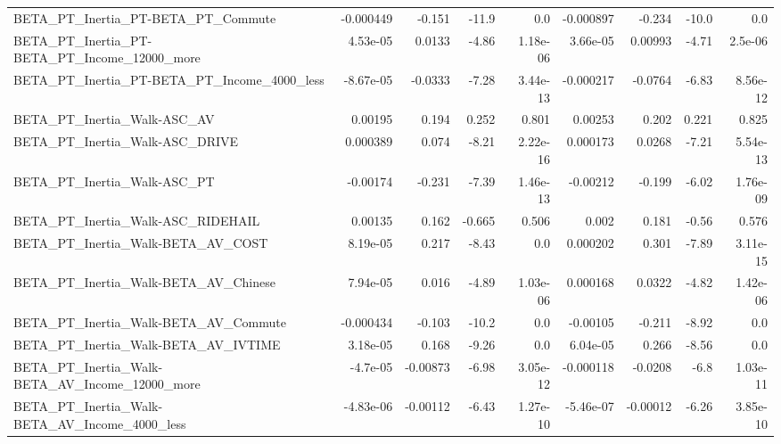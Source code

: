 \begin{tabular}{lrrrrrrrr}
BETA\_PT\_Inertia\_PT-BETA\_PT\_Commute                 &   -0.000449 &       -0.151 &    -11.9 &      0.0 &  -0.000897 &      -0.234 &        -10.0 &           0.0 \\
BETA\_PT\_Inertia\_PT-BETA\_PT\_Income\_12000\_more       &    4.53e-05 &       0.0133 &    -4.86 & 1.18e-06 &   3.66e-05 &     0.00993 &        -4.71 &       2.5e-06 \\
BETA\_PT\_Inertia\_PT-BETA\_PT\_Income\_4000\_less        &   -8.67e-05 &      -0.0333 &    -7.28 & 3.44e-13 &  -0.000217 &     -0.0764 &        -6.83 &      8.56e-12 \\
BETA\_PT\_Inertia\_Walk-ASC\_AV                        &     0.00195 &        0.194 &    0.252 &    0.801 &    0.00253 &       0.202 &        0.221 &         0.825 \\
BETA\_PT\_Inertia\_Walk-ASC\_DRIVE                     &    0.000389 &        0.074 &    -8.21 & 2.22e-16 &   0.000173 &      0.0268 &        -7.21 &      5.54e-13 \\
BETA\_PT\_Inertia\_Walk-ASC\_PT                        &    -0.00174 &       -0.231 &    -7.39 & 1.46e-13 &   -0.00212 &      -0.199 &        -6.02 &      1.76e-09 \\
BETA\_PT\_Inertia\_Walk-ASC\_RIDEHAIL                  &     0.00135 &        0.162 &   -0.665 &    0.506 &      0.002 &       0.181 &        -0.56 &         0.576 \\
BETA\_PT\_Inertia\_Walk-BETA\_AV\_COST                  &    8.19e-05 &        0.217 &    -8.43 &      0.0 &   0.000202 &       0.301 &        -7.89 &      3.11e-15 \\
BETA\_PT\_Inertia\_Walk-BETA\_AV\_Chinese               &    7.94e-05 &        0.016 &    -4.89 & 1.03e-06 &   0.000168 &      0.0322 &        -4.82 &      1.42e-06 \\
BETA\_PT\_Inertia\_Walk-BETA\_AV\_Commute               &   -0.000434 &       -0.103 &    -10.2 &      0.0 &   -0.00105 &      -0.211 &        -8.92 &           0.0 \\
BETA\_PT\_Inertia\_Walk-BETA\_AV\_IVTIME                &    3.18e-05 &        0.168 &    -9.26 &      0.0 &   6.04e-05 &       0.266 &        -8.56 &           0.0 \\
BETA\_PT\_Inertia\_Walk-BETA\_AV\_Income\_12000\_more     &    -4.7e-05 &     -0.00873 &    -6.98 & 3.05e-12 &  -0.000118 &     -0.0208 &         -6.8 &      1.03e-11 \\
BETA\_PT\_Inertia\_Walk-BETA\_AV\_Income\_4000\_less      &   -4.83e-06 &     -0.00112 &    -6.43 & 1.27e-10 &  -5.46e-07 &    -0.00012 &        -6.26 &      3.85e-10 \\

\end{tabular}
